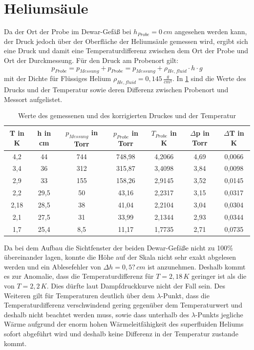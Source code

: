 \documentclass[twoside,colorback,accentcolor=tud4c,11pt]{tudreport}
\begin{document}
\section{Heliumsäule}
Da der Ort der Probe im Dewar-Gefäß bei $h_{Probe}=0\,\si{cm}$ angesehen werden kann, der Druck jedoch über der Oberfläche der Heliumsäule gemessen wird, ergibt sich eine Druck und damit eine Temperaturdifferenz zwischen dem Ort der Probe und Ort der Durckmessung. Für den Druck am Probenort gilt:
\begin{equation}
p_{Probe}=p_{Messung}+p_{Probe}=p_{Messung}+\rho_{He,fluid}\cdot h \cdot g
\end{equation}
mit der Dichte für Flüssiges Helium $\rho_{He,fluid}=0,145\,\si{\frac{g}{cm^3}}$. In \ref{ptkorr} sind die Werte des Drucks und der Temperatur sowie deren Differenz zwischen Probenort und Messort aufgelistet.
\begin{table}[H]
\centering
\begin{tabular}{|c|c|c|c|c|c|c|}
\hline 
T in K & h in cm & $p_{Messung}$ in Torr & $p_{Probe}$ in Torr & $T_{Probe}$ in K & $\Delta$p in Torr & $\Delta$T in K\\ 
\hline 
4,2 & 44 & 744 & 748,98 & 4,2066 & 4,69 & 0,0066 \\ 
\hline 
3,4 & 36 & 312 & 315,87 & 3,4098 & 3,84 & 0,0098 \\ 
\hline 
2,9 & 33 & 155 & 158,26 & 2,9145 & 3,52 & 0,0145 \\ 
\hline 
2,2 & 29,5 & 50 & 43,16 & 2,2317 & 3,15 & 0,0317 \\ 
\hline 
2,18 & 28,5 & 38 & 41,04 & 2,2104 & 3,04 & 0,0304 \\ 
\hline 
2,1 & 27,5 & 31 & 33,99 & 2,1344 & 2,93 & 0,0344 \\ 
\hline 
1,7 & 25,4 & 8,5 & 11,17 & 1,7735 & 2,71 & 0,0735 \\ 
\hline 
\end{tabular}
\caption{Werte des gemessenen und des korrigierten Druckes und der Temperatur}\label{ptkorr}
\end{table} 
Da bei dem Aufbau die Sichtfenster der beiden Dewar-Gefäße nicht zu 100\% übereinander lagen, konnte die Höhe auf der Skala nicht sehr exakt abgelesen werden und ein Ablesefehler von $\Delta h=0,5?\,\si{cm}$ ist anzunehmen. Deshalb kommt es zur Anomalie, dass die Temperaturdifferenz für $T=2,18\,\si{K}$ geringer ist als die von $T=2,2\,\si{K}$. Dies dürfte laut Dampfdruckkurve nicht der Fall sein. Des Weiteren gilt für Temperaturen deutlich über dem $\lambda$-Punkt, dass die Temperaturdifferenz verschwindend gering gegenüber dem Temperaturwert und deshalb nicht beachtet werden muss, sowie dass unterhalb des $\lambda$-Punkts jegliche Wärme aufgrund der enorm hohen Wärmeleitfähigkeit des superfluiden Heliums sofort abgeführt wird und deshalb keine Differenz in der Temperatur zustande kommt.
\end{document}
